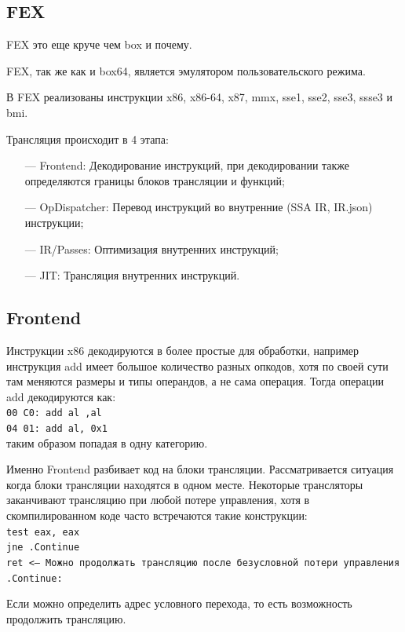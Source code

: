 \subsection{FEX}

FEX это еще круче чем box и почему.

FEX, так же как и box64, является эмулятором пользовательского режима.

В FEX реализованы инструкции x86, x86-64, x87, mmx, sse1, sse2, sse3, ssse3 и bmi.

Трансляция происходит в 4 этапа:

\begin{itemize}[leftmargin=1.6\parindent]
	\item[---] Frontend: Декодирование инструкций, при декодировании также определяются границы блоков трансляции и функций;
	\item[---] OpDispatcher: Перевод инструкций во внутренние (SSA IR, IR.json) инструкции;
	\item[---] IR/Passes: Оптимизация внутренних инструкций;
	\item[---] JIT: Трансляция внутренних инструкций.
\end{itemize}

\subsection{Frontend}
Инструкции x86 декодируются в более простые для обработки, например инструкция add имеет большое количество разных опкодов, хотя по своей сути там меняются размеры и типы операндов, а не сама операция. Тогда операции add декодируются как:
\texttt{
\\
00 C0: add al ,al  \\
04 01: add al, 0x1 \\}
таким образом попадая в одну категорию.

Именно Frontend разбивает код на блоки трансляции. Рассматривается ситуация когда блоки трансляции находятся в одном месте. Некоторые трансляторы заканчивают трансляцию при любой потере управления, хотя в скомпилированном коде часто встречаются такие конструкции:
\texttt{
\\
test eax, eax\\
jne .Continue\\
ret           <--- Можно продолжать трансляцию после безусловной потери управления\\
.Continue:\\
}

Если можно определить адрес условного перехода, то есть возможность продолжить трансляцию.

